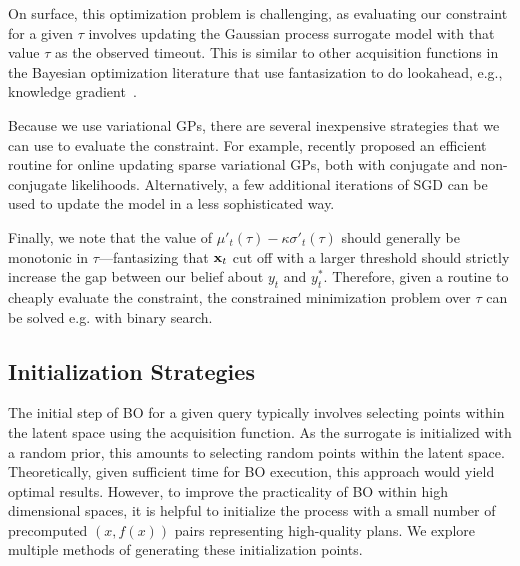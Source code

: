 On  surface, this optimization problem is challenging, as evaluating our constraint for a given $\tau$ involves updating the Gaussian process surrogate model with that value $\tau$ as the observed timeout. This is similar to other acquisition functions in the Bayesian optimization literature that use fantasization to do lookahead, e.g., knowledge gradient~\cite{frazier2009knowledge}.

Because we use variational GPs, there are several inexpensive strategies that we can use to evaluate the constraint. For example, \citet{maddox2021conditioning} recently proposed an efficient routine for online updating sparse variational GPs, both with conjugate and non-conjugate likelihoods. Alternatively, a few additional iterations of SGD can be used to update the model in a less sophisticated way.

Finally, we note that the value of $\mu'_{t}(\tau) - \kappa \sigma'_{t}(\tau)$ should generally be monotonic in $\tau$---fantasizing that $\mathbf{x}_{t}$ cut off with a larger threshold should strictly increase the gap between our belief about $y_{t}$ and $y^{*}_{t}$. Therefore, given a routine to cheaply evaluate the constraint, the constrained minimization problem over $\tau$ can be solved e.g. with binary search.


\subsection{Initialization Strategies} \label{sec:initialization_strategies}
The initial step of BO for a given query typically involves selecting points within the latent space using the acquisition function. As the surrogate is initialized with a random prior, this amounts to selecting random points within the latent space. Theoretically, given sufficient time for BO execution, this approach would yield optimal results. However, to improve the practicality of BO within high dimensional spaces, it is helpful to initialize the process with a small number of precomputed $(x, f(x))$ pairs representing high-quality plans. We explore multiple methods of generating these initialization points.


